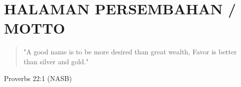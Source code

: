 \chapter*{\uppercase{Halaman Persembahan / Motto}}

\vspace{2cm}
\begin{quote}
    
"A good name is to be more desired than great wealth,
Favor is better than silver and gold."

\end{quote}

\hfill Proverbs 22:1 (NASB)